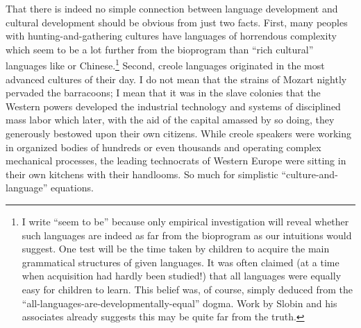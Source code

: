 That there is indeed no simple connection between language development and cultural development should be obvious from just two facts. First, many peoples with hunting-and-gathering cultures have languages of horrendous complexity which seem to be a lot further from the bioprogram than ``rich cultural'' languages like  or Chinese.\footnote{I write ``seem to be'' because only empirical investigation will reveal whether such languages are indeed as far from the bioprogram as our intuitions would suggest. One test will be the time taken by children to acquire the main grammatical structures of given languages. It was often claimed (at a time when acquisition had hardly been studied!) that all languages were equally easy for children to learn. This belief was, of course, simply deduced from the ``all-languages-are-developmentally-equal'' dogma. Work by Slobin and his associates already suggests this may be quite far from the truth.} Second, creole languages originated in the most advanced cultures of their day. I do not mean that the strains of Mozart nightly pervaded the barracoons; I mean that it was in the slave colonies that the Western powers developed the industrial technology and systems of disciplined mass labor which later, with the aid of the capital amassed by so doing, they generously bestowed upon their own citizens. While creole speakers were working in organized bodies of hundreds or even thousands and operating complex mechanical processes, the leading technocrats of Western Europe were sitting in their own kitchens with their handlooms. \enlargethispage{1\baselineskip}So much for simplistic ``culture-and-language'' equations.


